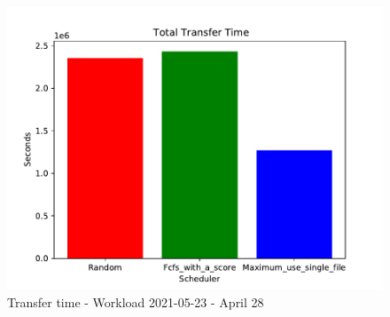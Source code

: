 \documentclass[a4paper]{article}
\begin{document}
\begin{figure}[ht]\includegraphics[scale=1]{MBSS/plot/2021-05-23_Total_transfer_time.pdf}\caption{Transfer time - Workload 2021-05-23 - April 28}\end{figure}
\end{document}
